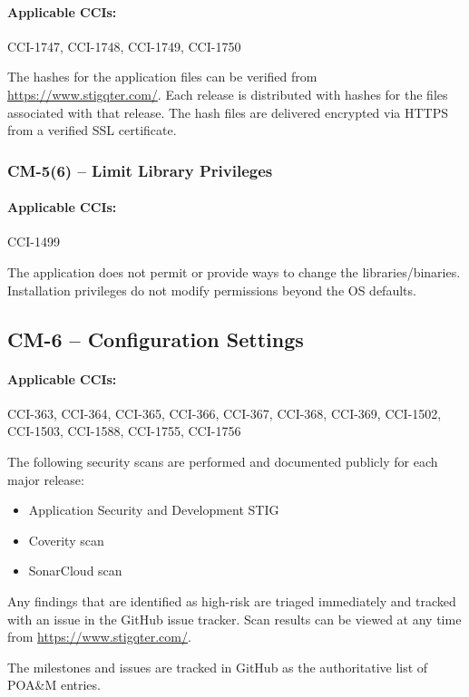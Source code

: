 \documentclass[letterpaper, 10pt, twoside]{article}
\begin{document}
\paragraph{Applicable CCIs:} CCI-1747, CCI-1748, CCI-1749, CCI-1750

The hashes for the application files can be verified from \url{https://www.stigqter.com/}. Each release is distributed with hashes for the files associated with that release. The hash files are delivered encrypted via HTTPS from a verified SSL certificate.

\subsubsection{CM-5(6) -- Limit Library Privileges}

\paragraph{Applicable CCIs:} CCI-1499

The application does not permit or provide ways to change the libraries/binaries. Installation privileges do not modify permissions beyond the OS defaults.

\subsection{CM-6 -- Configuration Settings}

\paragraph{Applicable CCIs:} CCI-363, CCI-364, CCI-365, CCI-366, CCI-367, CCI-368, CCI-369, CCI-1502, CCI-1503, CCI-1588, CCI-1755, CCI-1756

The following security scans are performed and documented publicly for each major release:
\begin{itemize}
	\item Application Security and Development STIG
	\item Coverity scan
	\item SonarCloud scan
\end{itemize}

Any findings that are identified as high-risk are triaged immediately and tracked with an issue in the GitHub issue tracker. Scan results can be viewed at any time from \url{https://www.stigqter.com/}.

The milestones and issues are tracked in GitHub as the authoritative list of POA\&M entries.
\end{document}
